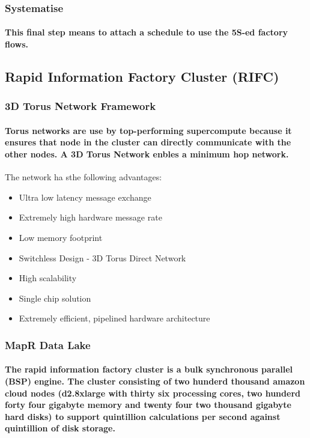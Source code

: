 \subsubsection{Systematise}
\paragraph{This final step means to attach a schedule to use the 5S-ed factory flows.}
\pagebreak
\subsection{Rapid Information Factory Cluster (RIFC)}
\subsubsection{3D Torus Network Framework}
\paragraph{Torus networks are use by top-performing supercompute because it ensures that node in the cluster can directly communicate with the other nodes. A 3D Torus Network enbles a minimum hop network.}
{The network ha sthe following advantages:}
\begin{itemize}
  \item Ultra low latency message exchange
  \item Extremely high hardware message rate
  \item Low memory footprint
  \item Switchless Design - 3D Torus Direct Network
  \item High scalability
  \item Single chip solution
  \item Extremely efficient, pipelined hardware architecture
\end{itemize}
\subsubsection{MapR Data Lake}
\paragraph{The rapid information factory cluster is a bulk synchronous parallel (BSP) engine. The cluster consisting of two hunderd thousand amazon cloud nodes (d2.8xlarge with thirty six processing cores, two hunderd forty four gigabyte memory and twenty four two thousand gigabyte hard disks) to support quintillion calculations per second against quintillion of disk storage.}
